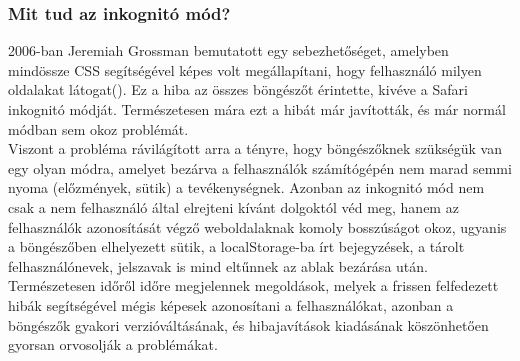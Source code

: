 \subsubsection{Mit tud az inkognitó mód?} %

2006-ban Jeremiah Grossman bemutatott egy sebezhetőséget, amelyben mindössze CSS segítségével képes volt megállapítani, hogy felhasználó milyen oldalakat látogat(\cite{css_history_hack}). Ez a hiba az összes böngészőt érintette, kivéve a Safari inkognitó módját. Természetesen mára ezt a hibát már javították, és már normál módban sem okoz problémát.\hfill\\
Viszont a probléma rávilágított arra a tényre, hogy böngészőknek szükségük van egy olyan módra, amelyet bezárva a felhasználók számítógépén nem marad semmi nyoma (előzmények, sütik) a tevékenységnek. Azonban az inkognitó mód nem csak a nem felhasználó által elrejteni kívánt dolgoktól véd meg, hanem az felhasználók azonosítását végző weboldalaknak komoly bosszúságot okoz, ugyanis a böngészőben elhelyezett sütik, a localStorage-ba írt bejegyzések, a tárolt felhasználónevek, jelszavak is mind eltűnnek az ablak bezárása után.\hfill\\
Természetesen időről időre megjelennek megoldások, melyek a frissen felfedezett hibák segítségével mégis képesek azonosítani a felhasználókat, azonban a böngészők gyakori verzióváltásának, és hibajavítások kiadásának köszönhetően gyorsan orvosolják a problémákat.
\label{ssub:miért}

\label{sub:inkognitó_mód}

